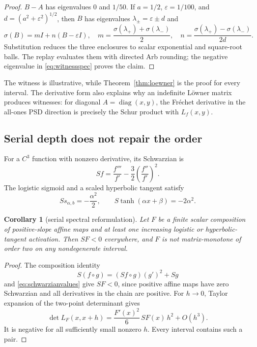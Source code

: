 \documentclass[11pt]{article}
\newtheorem{corollary}[theorem]{Corollary}
\newcommand{\diag}{\operatorname{diag}}
\begin{document}
\begin{proof}
$B-A$ has eigenvalues $0$ and $1/50$.  If $a=1/2$, $\varepsilon=1/100$, and
$d=(a^2+\varepsilon^2)^{1/2}$, then $B$ has eigenvalues $\lambda_\pm=\varepsilon\pm d$ and
\[
 \sigma(B)=mI+n(B-\varepsilon I),\quad
 m=\frac{\sigma(\lambda_+)+\sigma(\lambda_-)}2,\quad
 n=\frac{\sigma(\lambda_+)-\sigma(\lambda_-)}{2d}.
\]
Substitution reduces the three enclosures to scalar exponential and square-root balls.  The replay evaluates them
with directed Arb rounding; the negative eigenvalue in \eqref{eq:witnessspec} proves the claim.
\end{proof}

The witness is illustrative, while Theorem~\ref{thm:loewner} is the proof for every interval.  The derivative form
also explains why an indefinite L\"owner matrix produces witnesses: for diagonal
$A=\diag(x,y)$, the Fr\'echet derivative in the all-ones PSD direction is precisely the Schur product with
$L_f(x,y)$.

\subsection{Serial depth does not repair the order}

For a $C^3$ function with nonzero derivative, its Schwarzian is
\begin{equation}
 Sf=\frac{f'''}{f'}-\frac32\left(\frac{f''}{f'}\right)^2.
 \label{eq:schwarzian}
\end{equation}
The logistic sigmoid and a scaled hyperbolic tangent satisfy
\begin{equation}
 S s_{\alpha,b}=-\frac{\alpha^2}{2},\qquad
 S\tanh(\alpha x+\beta)=-2\alpha^2.
 \label{eq:schwarzianvalues}
\end{equation}

\begin{corollary}[serial spectral reformulation]
\label{thm:serial}
Let $F$ be a finite scalar composition of positive-slope affine maps and at least one increasing logistic or
hyperbolic-tangent activation.  Then $SF<0$ everywhere, and $F$ is not matrix-monotone of order two on any
nondegenerate interval.
\end{corollary}

\begin{proof}
The composition identity
\begin{equation}
 S(f\circ g)=(Sf\circ g)(g')^2+Sg
 \label{eq:schwarzchain}
\end{equation}
and \eqref{eq:schwarzianvalues} give $SF<0$, since positive affine maps have zero Schwarzian and all derivatives in
the chain are positive.  For $h\to0$, Taylor expansion of the two-point determinant gives
\begin{equation}
 \det L_F(x,x+h)=\frac{F'(x)^2}{6}\,SF(x)\,h^2+O(h^3).
 \label{eq:localschwarz}
\end{equation}
It is negative for all sufficiently small nonzero $h$.  Every interval contains such a pair.
\end{proof}
\end{document}
